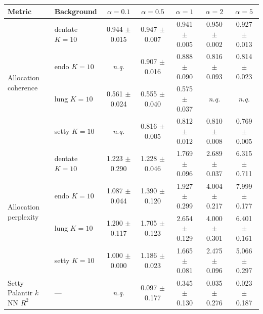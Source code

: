\begin{tabular}{llccccc}
\toprule
Metric & Background & $\alpha=0.1$ & $\alpha=0.5$ & $\alpha=1$ & $\alpha=2$ & $\alpha=5$ \\
\midrule
\multirow{4}{*}{Allocation coherence} & dentate $K=10$ & 0.944 $\pm$ 0.015 & 0.947 $\pm$ 0.007 & 0.941 $\pm$ 0.005 & 0.950 $\pm$ 0.002 & 0.927 $\pm$ 0.013 \\
 & endo $K=10$ & \textit{n.q.} & 0.907 $\pm$ 0.016 & 0.888 $\pm$ 0.090 & 0.816 $\pm$ 0.093 & 0.814 $\pm$ 0.023 \\
 & lung $K=10$ & 0.561 $\pm$ 0.024 & 0.555 $\pm$ 0.040 & 0.575 $\pm$ 0.037 & \textit{n.q.} & \textit{n.q.} \\
 & setty $K=10$ & \textit{n.q.} & 0.816 $\pm$ 0.005 & 0.812 $\pm$ 0.012 & 0.810 $\pm$ 0.008 & 0.769 $\pm$ 0.005 \\
\midrule
\multirow{4}{*}{Allocation perplexity} & dentate $K=10$ & 1.223 $\pm$ 0.290 & 1.228 $\pm$ 0.046 & 1.769 $\pm$ 0.096 & 2.689 $\pm$ 0.037 & 6.315 $\pm$ 0.711 \\
 & endo $K=10$ & 1.087 $\pm$ 0.044 & 1.390 $\pm$ 0.120 & 1.927 $\pm$ 0.299 & 4.004 $\pm$ 0.217 & 7.999 $\pm$ 0.177 \\
 & lung $K=10$ & 1.200 $\pm$ 0.117 & 1.705 $\pm$ 0.123 & 2.654 $\pm$ 0.129 & 4.000 $\pm$ 0.301 & 6.401 $\pm$ 0.161 \\
 & setty $K=10$ & 1.000 $\pm$ 0.000 & 1.186 $\pm$ 0.023 & 1.665 $\pm$ 0.081 & 2.475 $\pm$ 0.096 & 5.066 $\pm$ 0.297 \\
\midrule
Setty Palantir $k$NN $R^2$ & --- & \textit{n.q.} & 0.097 $\pm$ 0.177 & 0.345 $\pm$ 0.130 & 0.035 $\pm$ 0.276 & 0.023 $\pm$ 0.187 \\
\bottomrule
\end{tabular}
